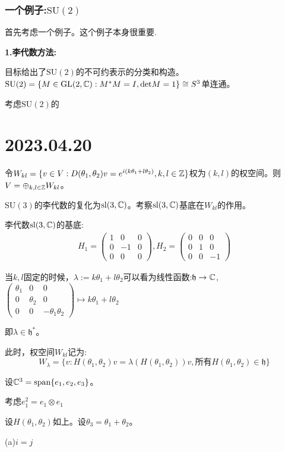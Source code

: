 \subsection{一个例子:$\mathrm{SU}(2)$}
首先考虑一个例子。这个例子本身很重要.
\begin{example}
    \textbf{1.李代数方法:}

    目标给出了$\mathrm{SU}(2)$的不可约表示的分类和构造。
    $\mathrm{SU}(2)=\{M \in \mathrm{GL}(2,\mathbb{C}):M^*M=I,\mathrm{det}M=1\}\cong S^3$单连通。
\end{example}
考虑$\mathrm{SU}(2)$的

\chapter{2023.04.20}
令$W_{kl}=\{v \in V:D(\theta_1,\theta_2)v=e^{i(k\theta_1+l\theta_2)},k,l \in \mathbb{Z}\}$权为$(k,l)$的权空间。则$V=\oplus_{k,l \in \mathbb{Z}} W_{kl}$。

$\mathrm{SU}(3)$的李代数的复化为$\mathrm{sl}(3,\mathbb{C})$。考察$\mathrm{sl}(3,\mathbb{C})$基底在$W_{kl}$的作用。

李代数$\mathrm{sl}(3,\mathbb{C})$的基底:
\begin{align*}
    H_1=\begin{pmatrix}
        1&0&0\\0&-1&0\\0&0&0
    \end{pmatrix},H_2=\begin{pmatrix}
        0&0&0\\0&1&0\\0&0&-1
    \end{pmatrix}
\end{align*}

\begin{remark}
    当$k,l$固定的时候，$\lambda:=k\theta_1+l\theta_2$可以看为线性函数:$\mathfrak{h} \to \mathbb{C}$,$\begin{pmatrix}
        \theta_1&0&0\\0&\theta_2&0\\0&0&-\theta_1\theta_2
    \end{pmatrix}\mapsto k\theta_1+l\theta_2$

    即$\lambda\in \mathfrak{h}^*$。

    此时，权空间$W_{kl}$记为:
    $$
    W_\lambda=\{v:H(\theta_1,\theta_2)v=\lambda(H(\theta_1,\theta_2))v,\text{所有}H(\theta_1,\theta_2)\in \mathfrak{h}\}
    $$
\end{remark}
\begin{example}[标准表示]
    设$\mathbb{C}^3=\mathrm{span}\{e_1,e_2,e_3\}$。
\end{example}
\begin{example}
    考虑$e_1^2=e_1\otimes e_1$
\end{example}
\begin{example}[伴随表示]
    设$H(\theta_1,\theta_2)$如上。设$\theta_3=\theta_1+\theta_2$。

    (a)$i=j$
\end{example}
